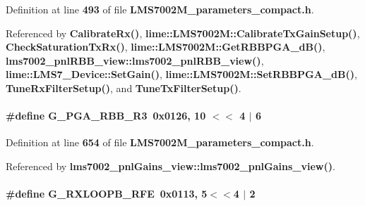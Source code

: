 Definition at line {\bf 493} of file {\bf L\+M\+S7002\+M\+\_\+parameters\+\_\+compact.\+h}.



Referenced by {\bf Calibrate\+Rx()}, {\bf lime\+::\+L\+M\+S7002\+M\+::\+Calibrate\+Tx\+Gain\+Setup()}, {\bf Check\+Saturation\+Tx\+Rx()}, {\bf lime\+::\+L\+M\+S7002\+M\+::\+Get\+R\+B\+B\+P\+G\+A\+\_\+d\+B()}, {\bf lms7002\+\_\+pnl\+R\+B\+B\+\_\+view\+::lms7002\+\_\+pnl\+R\+B\+B\+\_\+view()}, {\bf lime\+::\+L\+M\+S7\+\_\+\+Device\+::\+Set\+Gain()}, {\bf lime\+::\+L\+M\+S7002\+M\+::\+Set\+R\+B\+B\+P\+G\+A\+\_\+d\+B()}, {\bf Tune\+Rx\+Filter\+Setup()}, and {\bf Tune\+Tx\+Filter\+Setup()}.

\paragraph[{G\+\_\+\+P\+G\+A\+\_\+\+R\+B\+B\+\_\+\+R3}]{\setlength{\rightskip}{0pt plus 5cm}\#define G\+\_\+\+P\+G\+A\+\_\+\+R\+B\+B\+\_\+\+R3~0x0126, 10 $<$$<$ 4 $\vert$ 6}\label{LMS7002M__parameters__compact_8h_a360e5b4fcd94dfffc6a250d6aa0f4417}


Definition at line {\bf 654} of file {\bf L\+M\+S7002\+M\+\_\+parameters\+\_\+compact.\+h}.



Referenced by {\bf lms7002\+\_\+pnl\+Gains\+\_\+view\+::lms7002\+\_\+pnl\+Gains\+\_\+view()}.

\paragraph[{G\+\_\+\+R\+X\+L\+O\+O\+P\+B\+\_\+\+R\+FE}]{\setlength{\rightskip}{0pt plus 5cm}\#define G\+\_\+\+R\+X\+L\+O\+O\+P\+B\+\_\+\+R\+FE~0x0113, 5$<$$<$4 $\vert$  2}\label{LMS7002M__parameters__compact_8h_add88e4d69b6d5964f531ebb10edfed67}


